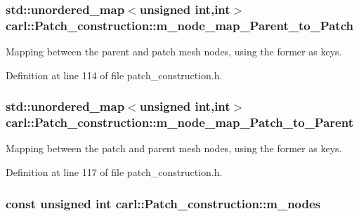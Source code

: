 \subsubsection[{m\+\_\+node\+\_\+map\+\_\+\+Parent\+\_\+to\+\_\+\+Patch}]{\setlength{\rightskip}{0pt plus 5cm}std\+::unordered\+\_\+map$<$unsigned int,int$>$ carl\+::\+Patch\+\_\+construction\+::m\+\_\+node\+\_\+map\+\_\+\+Parent\+\_\+to\+\_\+\+Patch\hspace{0.3cm}{\ttfamily [protected]}}\label{classcarl_1_1_patch__construction_aace17a766982c2c00b603561f3df9814}


Mapping between the parent and patch mesh nodes, using the former as keys. 



Definition at line 114 of file patch\+\_\+construction.\+h.

\hypertarget{classcarl_1_1_patch__construction_a8a53700b4debd54f12cd42d62f991e5a}{}
\subsubsection[{m\+\_\+node\+\_\+map\+\_\+\+Patch\+\_\+to\+\_\+\+Parent}]{\setlength{\rightskip}{0pt plus 5cm}std\+::unordered\+\_\+map$<$unsigned int,int$>$ carl\+::\+Patch\+\_\+construction\+::m\+\_\+node\+\_\+map\+\_\+\+Patch\+\_\+to\+\_\+\+Parent\hspace{0.3cm}{\ttfamily [protected]}}\label{classcarl_1_1_patch__construction_a8a53700b4debd54f12cd42d62f991e5a}


Mapping between the patch and parent mesh nodes, using the former as keys. 



Definition at line 117 of file patch\+\_\+construction.\+h.

\hypertarget{classcarl_1_1_patch__construction_abd159e87cbe0bb4e9ec31283779c691c}{}
\subsubsection[{m\+\_\+nodes}]{\setlength{\rightskip}{0pt plus 5cm}const unsigned int carl\+::\+Patch\+\_\+construction\+::m\+\_\+nodes\hspace{0.3cm}{\ttfamily [protected]}}\label{classcarl_1_1_patch__construction_abd159e87cbe0bb4e9ec31283779c691c}


